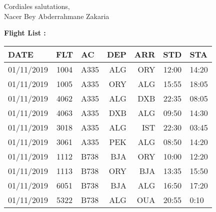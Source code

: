 \documentclass[a4paper, 11pt]{report}
\begin{document}
\vspace{2\baselineskip}
\begin{flushleft}
    Cordiales salutations,\\
    Nacer Bey Abderrahmane Zakaria
\end{flushleft}
\clearpage
\begin{flushleft}
  \Huge{\textbf{Flight List :}}\\
  \begin{table}[h!]
  \centering
      \begin{tabular}{l|c|l|r|r|c|l|}
       \hline  
           DATE & FLT & AC & DEP & ARR & STD & STA \\
    \hline
01/11/2019&	1004&	A335&	ALG&	ORY&	12:00&	14:20\\
\hline
01/11/2019&	1005&	A335&	ORY&	ALG&	15:55&	18:05\\
\hline
01/11/2019&	4062&	A335&	ALG&	DXB&	22:35&	08:05\\
\hline
01/11/2019&	4063&	A335&	DXB&	ALG&    09:50&	14:30\\
\hline
01/11/2019&	3018&	A335&	ALG&	IST&	22:30&	03:45\\
\hline
01/11/2019&	3061&	A335&	PEK&	ALG&	08:50&	14:20\\
\hline
01/11/2019&	1112&	B738&	BJA&	ORY&	10:00&	12:20\\
\hline
01/11/2019&	1113&	B738&	ORY&	BJA&	13:35&	15:50\\
\hline
01/11/2019&	6051&	B738&	BJA&	ALG&	16:50&	17:20\\
\hline
01/11/2019&	5322&	B738&	ALG&	OUA&	20:55&	0:10\\
\hline
        
      \end{tabular}

  \end{table}
\end{flushleft}
\clearpage
\end{document}
